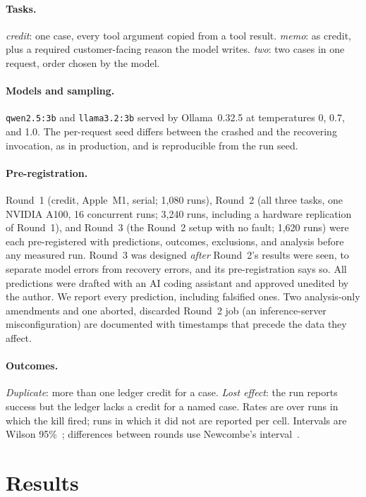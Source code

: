 \documentclass[11pt]{article}
\begin{document}
\paragraph{Tasks.} \emph{credit}: one case, every tool argument copied from a
tool result. \emph{memo}: as credit, plus a required customer-facing reason
the model writes. \emph{two}: two cases in one request, order chosen by the
model.

\paragraph{Models and sampling.} \texttt{qwen2.5:3b} and
\texttt{llama3.2:3b} served by Ollama~0.32.5 at temperatures 0, 0.7, and 1.0.
The per-request seed differs between the crashed and the recovering
invocation, as in production, and is reproducible from the run seed.

\paragraph{Pre-registration.} Round~1 (credit, Apple~M1, serial; 1,080 runs),
Round~2 (all three tasks, one NVIDIA A100, 16 concurrent runs; 3,240 runs,
including a hardware replication of Round~1), and Round~3 (the Round~2 setup
with no fault; 1,620 runs) were each pre-registered with predictions,
outcomes, exclusions, and analysis before any measured run. Round~3 was
designed \emph{after} Round~2's results were seen, to separate model errors
from recovery errors, and its pre-registration says so. All predictions were
drafted with an AI coding assistant and approved unedited by the author. We
report every prediction, including falsified ones. Two analysis-only
amendments and one aborted, discarded Round~2 job (an inference-server
misconfiguration) are documented with timestamps that precede the data they
affect.

\paragraph{Outcomes.} \emph{Duplicate}: more than one ledger credit for a
case. \emph{Lost effect}: the run reports success but the ledger lacks a
credit for a named case. Rates are over runs in which the kill fired; runs in
which it did not are reported per cell. Intervals are Wilson
95\%~\cite{wilson1927}; differences between rounds use Newcombe's
interval~\cite{newcombe1998}.

\section{Results}
\label{sec:results}
\end{document}
